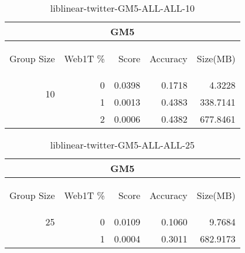 \begin{center}
\begin{table}[htbp]
\begin{tabular}{ | r | r | r | r | r |}
\hline
\multicolumn{5}{|c|}{GM5}\\
\hline
\begin{sideways}Group Size\end{sideways} & \begin{sideways}Web1T \%\end{sideways} & \begin{sideways}Score\end{sideways} & \begin{sideways}Accuracy\end{sideways} & \begin{sideways}Size(MB)\end{sideways}\\
\hline
\multirow{2}{*}{10}
 & 0 & 0.0398 & 0.1718 & 4.3228\\ \cline{2-5}
 & 1 & 0.0013 & 0.4383 & 338.7141\\ \cline{2-5}
 & 2 & 0.0006 & 0.4382 & 677.8461\\ \cline{2-5}
\hline
\end{tabular}
\caption{liblinear-twitter-GM5-ALL-ALL-10}
\label{table:liblinear-twitter-GM5-ALL-ALL-10}
\end{table}
\end{center}

\begin{center}
\begin{table}[htbp]
\begin{tabular}{ | r | r | r | r | r |}
\hline
\multicolumn{5}{|c|}{GM5}\\
\hline
\begin{sideways}Group Size\end{sideways} & \begin{sideways}Web1T \%\end{sideways} & \begin{sideways}Score\end{sideways} & \begin{sideways}Accuracy\end{sideways} & \begin{sideways}Size(MB)\end{sideways}\\
\hline
\multirow{1}{*}{25}
 & 0 & 0.0109 & 0.1060 & 9.7684\\ \cline{2-5}
 & 1 & 0.0004 & 0.3011 & 682.9173\\ \cline{2-5}
\hline
\end{tabular}
\caption{liblinear-twitter-GM5-ALL-ALL-25}
\label{table:liblinear-twitter-GM5-ALL-ALL-25}
\end{table}
\end{center}

